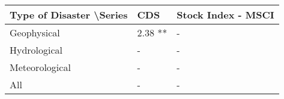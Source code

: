 \begin{tabular}{@{}lll@{}}
\toprule
Type of Disaster \textbackslash Series & CDS & Stock Index - MSCI \\ \midrule
Geophysical & 2.38 ** & - \\
Hydrological & - & - \\
Meteorological & - & - \\
All & - & - \\ \bottomrule
\end{tabular}